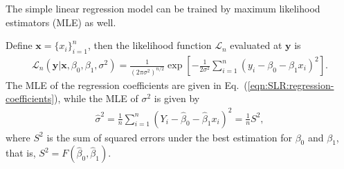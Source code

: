 \documentclass{book}
\begin{document}
The simple linear regression model can be trained by maximum likelihood estimators (MLE) as well.

\theorem Define $\mathbf{x} = \{x_i\}_{i=1}^n$, then the likelihood function $\mathcal{L}_n$ evaluated at $\mathbf{y}$ is 
\begin{align}
    \mathcal{L}_n(\mathbf{y}|\mathbf{x},\beta_0,\beta_1,\sigma^2) = 
    \frac{1}{(2\pi\sigma^2)^{n/2}}
    \exp\left[
    -\frac{1}{2\sigma^2} \sum_{i=1}^n (y_i - \beta_0 -\beta_1 x_i)^2
    \right].
\end{align}
The MLE of the regression coefficients are given in Eq.~(\ref{eqn:SLR:regression-coefficients}), while the MLE of $\sigma^2$ is given by
\begin{align}
    \hat{\sigma}^2 = \frac{1}{n}\sum_{i=1}^n (Y_i - \hat\beta_0 -\hat\beta_1 x_i)^2 = \frac{1}{n}S^2,
\end{align}
where $S^2$ is the sum of squared errors under the best estimation for $\beta_0$ and $\beta_1$, that is, $S^2 = F(\hat\beta_0,\hat\beta_1)$.
\end{document}
